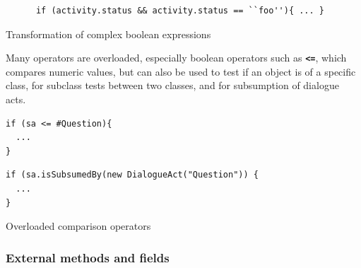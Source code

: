 \begin{table}[htbp]
  \centering
  \begin{small}
    \begin{lstlisting}
      if (activity.status && activity.status == ``foo''){ ... }
    \end{lstlisting}
  \end{small}

\caption{Transformation of complex boolean expressions}
\label{tab:multi-predaccess-wrong}
\end{table}
\vspace*{10pt}


Many operators are overloaded, especially boolean operators such as
\textbf{\texttt{<=}}, which compares numeric values, but can also be used to test if an
object is of a specific class, for subclass tests between two classes, and for
subsumption of dialogue acts.

\begin{table}[htbp]
  \centering
  \begin{footnotesize}
    \begin{minipage}{0.28\textwidth}
\begin{lstlisting}
if (sa <= #Question){
  ...
}
\end{lstlisting}
    \end{minipage}\vline\hspace{1em}
    \begin{minipage}{0.5\textwidth}
\begin{lstlisting}
if (sa.isSubsumedBy(new DialogueAct("Question")) {
  ...
}
\end{lstlisting}
    \end{minipage}
  \end{footnotesize}

  \caption{Overloaded comparison operators}
  \label{tab:overloaded-comparison}
\end{table}

\subsubsection{External methods and fields}
\label{sec:javatypes}

